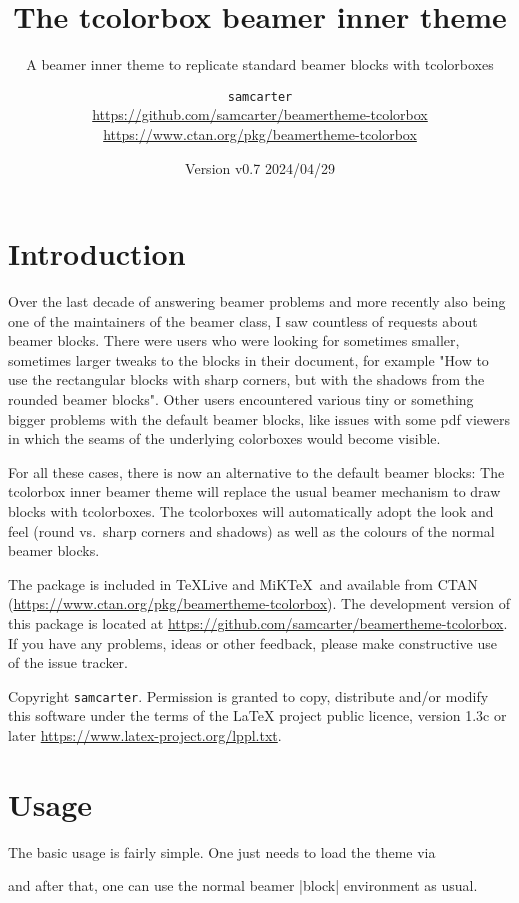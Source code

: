 \documentclass{scrartcl}
\title{The tcolorbox beamer inner theme}
\subtitle{A beamer inner theme to replicate standard beamer blocks with tcolorboxes}
\author{%
  \texorpdfstring{
    \texttt{samcarter}\\
    \url{https://github.com/samcarter/beamertheme-tcolorbox}\\
    \url{https://www.ctan.org/pkg/beamertheme-tcolorbox}
  }{samcarter}}
\date{Version v0.7 \textendash{} 2024/04/29}
\begin{document}
\maketitle

\section{Introduction}
\label{intro}

Over the last decade of answering beamer problems and more recently also being one of the maintainers of the beamer class, I saw countless of requests about beamer blocks. There were users who were looking for sometimes smaller, sometimes larger tweaks to the blocks in their document, for example "How to use the rectangular blocks with sharp corners, but with the shadows from the rounded beamer blocks". Other users encountered various tiny or something bigger problems with the default beamer blocks, like issues with some pdf viewers in which the seams of the underlying colorboxes would become visible.

For all these cases, there is now an alternative to the default beamer blocks: The tcolorbox inner beamer theme will replace the usual beamer mechanism to draw blocks with tcolorboxes. The tcolorboxes will automatically adopt the look and feel (round vs.\ sharp corners and shadows) as well as the colours of the normal beamer blocks.

The package is included in \TeX{}Live and MiK\TeX\ and available from \textsc{CTAN} (\url{https://www.ctan.org/pkg/beamertheme-tcolorbox}).
The development version of this package is located at \url{https://github.com/samcarter/beamertheme-tcolorbox}. If you have any problems, ideas or other feedback, please make constructive use of the issue tracker.

Copyright  \texttt{samcarter}. Permission is granted to copy, distribute and\slash or modify this software under the terms of the LaTeX project public licence, version 1.3c or later \url{https://www.latex-project.org/lppl.txt}.

\section{Usage}

The basic usage is fairly simple. One just needs to load the theme via
\begin{tcolorbox}[lower separated=false,title={Usage}]
\begin{samcode}
\end{samcode}
\end{tcolorbox}
and after that, one can use the normal beamer \saminline|block| environment as usual.
\end{document}
